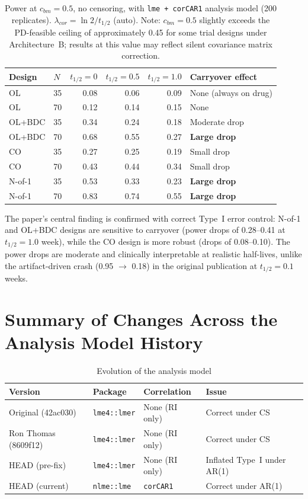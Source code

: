 \documentclass[11pt]{article}
\begin{document}
\begin{table}[h]
\centering
\caption{Power at $c_{bm} = 0.5$, no censoring, with
  \texttt{lme + corCAR1} analysis model (200 replicates).
  $\lambda_{cor} = \ln 2 / t_{1/2}$ (auto). Note:
  $c_{bm} = 0.5$ slightly exceeds the PD-feasible ceiling of
  approximately 0.45 for some trial designs under
  Architecture~B; results at this value may reflect silent
  covariance matrix correction.}
\begin{tabular}{llrrrl}
\toprule
Design & $N$ & $t_{1/2} = 0$ & $t_{1/2} = 0.5$ &
  $t_{1/2} = 1.0$ & Carryover effect \\
\midrule
OL & 35 & 0.08 & 0.06 & 0.09 & None (always on drug) \\
OL & 70 & 0.12 & 0.14 & 0.15 & None \\
\midrule
OL+BDC & 35 & 0.34 & 0.24 & 0.18 & Moderate drop \\
OL+BDC & 70 & 0.68 & 0.55 & 0.27 & \textbf{Large drop} \\
\midrule
CO & 35 & 0.27 & 0.25 & 0.19 & Small drop \\
CO & 70 & 0.43 & 0.44 & 0.34 & Small drop \\
\midrule
N-of-1 & 35 & 0.53 & 0.33 & 0.23 & \textbf{Large drop} \\
N-of-1 & 70 & 0.83 & 0.74 & 0.55 & \textbf{Large drop} \\
\bottomrule
\end{tabular}
\end{table}

The paper's central finding is confirmed with correct Type~I
error control: N-of-1 and OL+BDC designs are sensitive to
carryover (power drops of 0.28--0.41 at $t_{1/2} = 1.0$
week), while the CO design is more robust (drops of
0.08--0.10). The power drops are moderate and clinically
interpretable at realistic half-lives, unlike the
artifact-driven crash (0.95 $\to$ 0.18) in the original
publication at $t_{1/2} = 0.1$ weeks.

\section{Summary of Changes Across the Analysis Model History}

\begin{table}[h]
\centering
\caption{Evolution of the analysis model}
\small
\begin{tabular}{llll}
\toprule
Version & Package & Correlation & Issue \\
\midrule
Original (42ac030) & \texttt{lme4::lmer} & None (RI only) &
  Correct under CS \\
Ron Thomas (8609f12) & \texttt{lme4::lmer} & None (RI only) &
  Correct under CS \\
HEAD (pre-fix) & \texttt{lme4::lmer} & None (RI only) &
  Inflated Type~I under AR(1) \\
HEAD (current) & \texttt{nlme::lme} & \texttt{corCAR1} &
  Correct under AR(1) \\
\bottomrule
\end{tabular}
\end{table}
\end{document}

